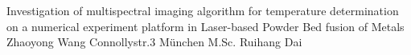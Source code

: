 \documentclass[IWBstudentthesis%
              ,optCharter%
              ,optBibtex%
              ,optBibstyleNumeric   %
              ,optEnglish%
              ,optCenterEquations%
              ]{IWBlatex}%
\begin{document}
%
\frontmatter%
%
% 
{Investigation of multispectral imaging algorithm for temperature
determination on a numerical experiment platform in Laser-based 
Powder Bed fusion of Metals}
{Zhaoyong Wang \newline Connollystr.3  München}
{\IWBnamesProfWudy \newline M.Sc. Ruihang Dai \newline \IWBlangChairMWLBAM}
{}%
%
%
%
%
%
\end{document}
